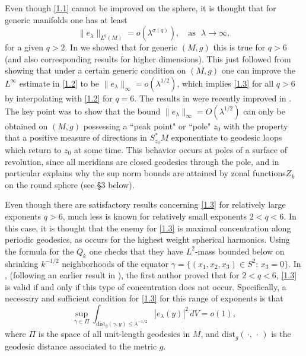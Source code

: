 \documentclass[10pt]{amsart}
\begin{document}
Even though \eqref{1.1} cannot be improved on the sphere, it is
thought that for generic manifolds one has at least
\begin{equation}\label{1.3}
\|e_\lambda\|_{L^q(M)}=o(\lambda^{\sigma(q)}),
\quad \text{as } \, \, \lambda\to \infty,
\end{equation}
for a given $q>2$. In \cite{soggezelditch} we showed that for
generic $(M,g)$ this is true for $q>6$ (and also corresponding
results for higher dimensions).  This just followed from showing
that under a certain generic condition on $(M,g)$ one can improve
the $L^\infty$ estimate in \eqref{1.2} to be $\|e_\lambda\|_\infty
=o(\lambda^{1/2})$, which implies \eqref{1.3} for all $q>6$ by
interpolating with \eqref{1.2} for $q=6$.  The results in
\cite{soggezelditch} were recently improved in \cite{stz}. The key
point was to show that the bound $\|e_\lambda\|_\infty =
O(\lambda^{1/2})$ can only be obtained on $(M, g)$ possessing a
``peak  point" or ``pole" $z_0$ with the property that a positive
measure of directions in $S^*_{z_0} M$ exponentiate to geodesic
loops which return to $z_0$ at some time. This behavior  occurs at
poles of a surface of revolution, since all meridians are closed
geodesics through the pole,  and in particular explains why the
sup norm bounds are attained by zonal functions$Z_k$ on the round
sphere (see \S 3 below).

Even though there are satisfactory results concerning
\eqref{1.3} for relatively large exponents $q>6$, much
less is known for relatively small exponents $2<q<6$.
In this case, it is thought that the enemy for \eqref{1.3}
is maximal concentration along periodic geodesics,
as occurs for the highest weight spherical harmonics.
Using the formula for the $Q_k$ one checks that
they have $L^2$-mass bounded below on shrinking
$k^{-1/2}$
neighborhoods of the equator $\gamma=
\{(x_1,x_2,x_3)\in S^2: \, x_3=0\}$.  In \cite{Sokakeya},
(following an earlier result in \cite{bourgainef}), the first
author proved that for $2<q<6$, \eqref{1.3} is valid if and
only if this type of concentration does not occur.  Specifically,
a necessary and sufficient condition for \eqref{1.3} for this
range of exponents is that
\begin{equation}\label{4}
\sup_{\gamma\in {\varPi}} \int_{\text{dist}_g(\gamma, y)\le \lambda^{-1/2}}
|e_\lambda(y)|^2 \, dV = o(1),
\end{equation}
where ${\varPi}$ is the space of all unit-length geodesics in
$M$, and $\text{dist}_g(\, \cdot, \, \cdot\, )$ is the geodesic
distance associated to the metric $g$.
\end{document}
